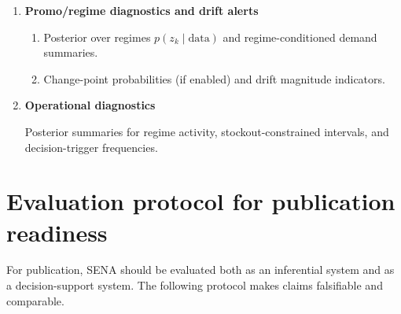 \documentclass[11pt]{article}
\begin{document}
\begin{enumerate}
  \item \textbf{Promo/regime diagnostics and drift alerts}
  \begin{enumerate}
    \item Posterior over regimes $p(z_k\mid\text{data})$ and regime-conditioned demand summaries.
    \item Change-point probabilities (if enabled) and drift magnitude indicators.
  \end{enumerate}

  \item \textbf{Operational diagnostics}

  Posterior summaries for regime activity, stockout-constrained intervals, and decision-trigger frequencies.
\end{enumerate}

\section{Evaluation protocol for publication readiness}\label{sec:eval-protocol}

For publication, SENA should be evaluated both as an inferential system and as a decision-support system. The following protocol makes claims falsifiable and comparable.
\end{document}
